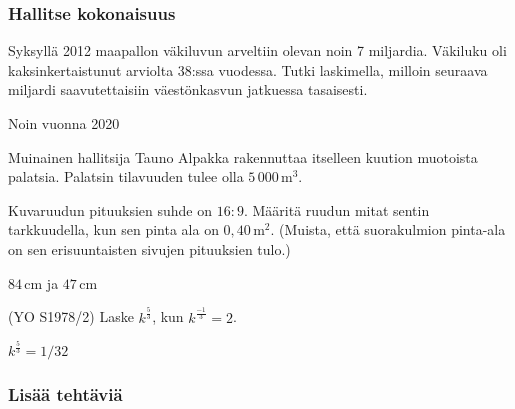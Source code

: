 \begin{tehtavasivu}
\subsubsection*{Hallitse kokonaisuus}
\begin{tehtava}%
Syksyllä 2012 maapallon väkiluvun arveltiin olevan noin 7 miljardia. Väkiluku oli kaksinkertaistunut arviolta 38:ssa vuodessa. Tutki laskimella, milloin seuraava miljardi saavutettaisiin väestönkasvun jatkuessa tasaisesti.
\begin{vastaus}
Noin vuonna 2020
\end{vastaus}
\end{tehtava}

\begin{tehtava}
Muinainen hallitsija Tauno Alpakka rakennuttaa itselleen kuution muotoista palatsia.  Palatsin tilavuuden tulee olla $5\,000\,\mathrm{m}^3$. 
\begin{vastaus}
\end{vastaus}
\end{tehtava}

\begin{tehtava}
Kuvaruudun pituuksien suhde on $16:9$. Määritä ruudun mitat sentin tarkkuudella, kun sen pinta ala on \(0,40\,\mathrm{m}^2\). (Muista, että suorakulmion pinta-ala on sen erisuuntaisten sivujen pituuksien tulo.)
\begin{vastaus}
$84\,$cm ja $47$\,cm
\end{vastaus}
\end{tehtava}

\begin{tehtava}
(YO S1978/2) Laske $k^\frac{5}{3}$, kun $k^\frac{-1}{3}=2$. \\
	\begin{vastaus}
		$k^\frac{5}{3}=1/32$
	\end{vastaus}
\end{tehtava}

\subsubsection*{Lisää tehtäviä}


\end{tehtavasivu}
